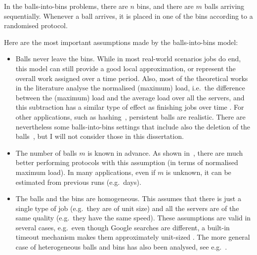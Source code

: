 \begin{definition} \label{definition: balls-into-bins}
In the balls-into-bins problems, there are $n$ bins, and there are $m$ balls arriving sequentially. Whenever a ball arrives, it is placed in one of the bins according to a randomised protocol.
\end{definition}

Here are the most important assumptions made by the balls-into-bins model:


\begin{itemize}
    \item
    Balls never leave the bins. While in most real-world scenarios jobs do end, this model can still provide a good local approximation, or represent the overall work assigned over a time period. Also, most of the theoretical works in the literature analyse the normalised (maximum) load, i.e.\ the difference between the (maximum) load and the average load over all the servers, and this subtraction has a similar type of effect as finishing jobs over time . For other applications, such as hashing~\cite{udi2017ballsintobinslandscape}, persistent balls are realistic. There are nevertheless some balls-into-bins settings that include also the deletion of the balls~\cite{azar1999twochoice}, but I will not consider those in this dissertation.
    \item
    The number of balls $m$ is known in advance. As shown in~\cite{feldheim2021longtermthinning}, there are much better performing protocols with this assumption (in terms of normalised maximum load). In many applications, even if $m$ is unknown, it can be estimated from previous runs (e.g.\ days).
    \item
    The balls and the bins are homogeneous. This assumes that there is just a single type of job (e.g.\ they are of unit size) and all the servers are of the same quality (e.g.\ they have the same speed). These assumptions are valid in several cases, e.g.\ even though Google searches are different, a built-in timeout mechanism makes them approximately unit-sized . The more general case of heterogeneous balls and bins has also been analysed, see e.g.~\cite{berenbrink2008weighted}.

\end{itemize}
